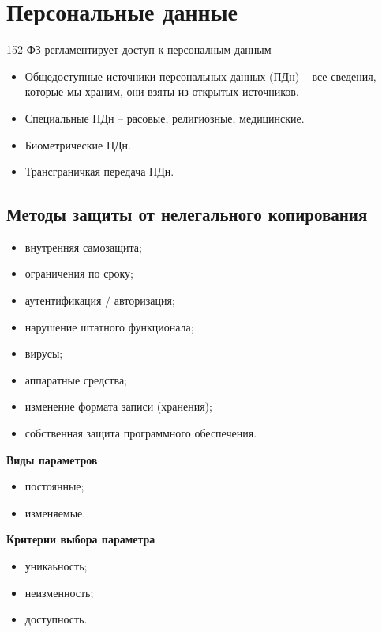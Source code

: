 \section{Персональные данные}

152 ФЗ регламентирует доступ к персоналным данным

\begin{itemize}
    \item Общедоступные источники персональных данных (ПДн) -- все сведения, которые мы храним, они взяты из открытых источников.
    \item Специальные ПДн -- расовые, религиозные, медицинские.
    \item Биометрические ПДн.
    \item Трансграничкая передача ПДн.
\end{itemize}

\subsection{Методы защиты от нелегального копирования}

\begin{itemize}
    \item внутренняя самозащита;
    \item ограничения по сроку;
    \item аутентификация / авторизация;
    \item нарушение штатного функционала;
    \item вирусы;
    \item аппаратные средства;
    \item изменение формата записи (хранения);
    \item собственная защита программного обеспечения.
\end{itemize}

\textbf{Виды параметров}

\begin{itemize}
    \item постоянные;
    \item изменяемые.
\end{itemize}

\textbf{Критерии выбора параметра}

\begin{itemize}
    \item уникаьность;
    \item неизменность;
    \item доступность.
\end{itemize}

